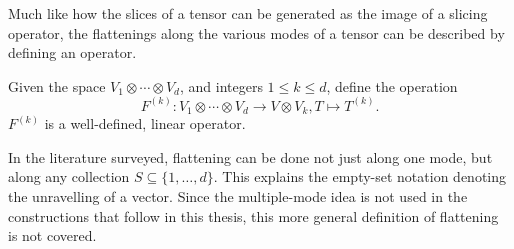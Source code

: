 \documentclass[../Lael_John_MasterThesis_Draft.tex]{subfiles}
\begin{document}
Much like how the slices of a tensor can be generated as the image of a slicing operator, the flattenings along the various modes of a tensor can be described by defining an operator.
\begin{definition}\label{defn:flatteningoperator}
    Given the space $V_1 \otimes \cdots \otimes V_d$, and integers $1 \leq k \leq d$, define the operation $$F^{(k)}:V_1\otimes \cdots \otimes V_d \to V \otimes V_k, T\mapsto T^{(k)}.$$ $F^{(k)}$ is a well-defined, linear operator. 
\end{definition}

\begin{remark}
    In the literature surveyed, flattening can be done not just along one mode, but along any collection $S \subseteq \{1, \ldots, d\}$. This explains the empty-set notation denoting the unravelling of a vector. Since the multiple-mode idea is not used in the constructions that follow in this thesis, this more general definition of flattening is not covered.
    
\end{remark}
\end{document}
